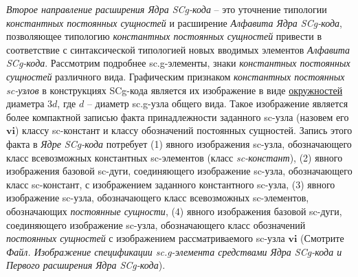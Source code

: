 \textit{Второе направление расширения Ядра SCg-кода} -- это уточнение типологии \textit{константных постоянных сущностей} и расширение \textit{Алфавита Ядра SCg-кода}, позволяющее типологию \textit{константных постоянных сущностей} привести в соответствие с синтаксической типологией новых вводимых элементов \textit{Алфавита SCg-кода}. Рассмотрим подробнее sc.g-элементы, знаки \textit{константных постоянных сущностей} различного вида. Графическим признаком \textit{константных постоянных sc-узлов} в конструкциях SCg-кода является их изображение в виде \uline{окружностей} диаметра $3d$, где $d$ -- диаметр sc.g-узла общего вида. Такое изображение является более компактной записью факта принадлежности заданного sc-узла (назовем его $\bm{vi}$) классу sc-констант и классу обозначений постоянных сущностей. Запись этого факта в \textit{Ядре SCg-кода} потребует (1) явного изображения sc-узла, обозначающего класс всевозможных константных sc-элементов (класс \textit{sc-констант}), (2) явного изображения базовой sc-дуги, соединяющего изображение sc-узла, обозначающего класс sc-констант, с изображением заданного константного sc-узла, (3) явного изображение sc-узла, обозначающего класс всевозможных sc-элементов, обозначающих \textit{постоянные сущности}, (4) явного изображения базовой sc-дуги, соединяющего изображение sc-узла, обозначающего класс обозначений \textit{постоянных сущностей} с изображением рассматриваемого sc-узла $\bm{vi}$ (Смотрите \textit{Файл. Изображение спецификации sc.g-элемента средствами Ядра SCg-кода и Первого расширения Ядра SCg-кода}).

